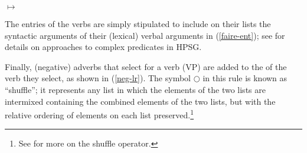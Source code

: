 \documentclass[output=paper
 	        ,biblatex
                ,babelshorthands
                ,newtxmath
                ,draftmode
                ,colorlinks, citecolor=brown
]{langscibook}
\begin{document}
\begin{exe}
\ex\label{res-lr}

	$\mapsto$
\end{exe}


The entries of the  verbs are simply stipulated to include on their \argst lists the syntactic arguments of their (lexical) verbal arguments in (\ref{faire-ent}); see  for details on approaches to complex predicates in HPSG.

\begin{exe}
\ex\label{faire-ent}
\end{exe} 

\noindent

Finally, (negative) adverbs that select for a verb (VP) are added to the \argst of the verb they select, as shown in (\ref{neg-lr}). 
The symbol $\bigcirc$\is{$\bigcirc$} in this rule is known as ``shuffle''; it represents any list 
 in which the elements of the two lists are intermixed
containing the combined elements of the two lists, but with the relative ordering of elements on each list preserved.\footnote{
See \crossrefchapterw[\pageref{order:rel-shuffle}]{order} for more on the shuffle operator.}
\end{document}
